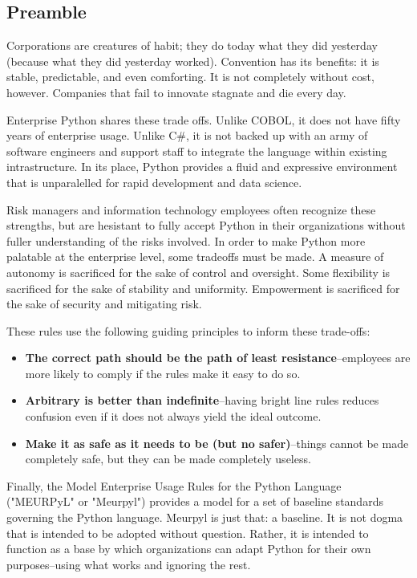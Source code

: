 

\subsection{Preamble}

Corporations are creatures of habit; they do today what they did yesterday (because what they did yesterday worked). Convention has its benefits: it is stable, predictable, and even comforting. It is not completely without cost, however. Companies that fail to innovate stagnate and die every day.

Enterprise Python shares these trade offs. Unlike COBOL, it does not have fifty years of enterprise usage. Unlike C\#, it is not backed up with an army of software engineers and support staff to integrate the language within existing intrastructure. In its place, Python provides a fluid and expressive environment that is unparalelled for rapid development and data science.

Risk managers and information technology employees often recognize these strengths, but are hesistant to fully accept Python in their organizations without fuller understanding of the risks involved. In order to make Python more palatable at the enterprise level, some tradeoffs must be made. A measure of autonomy is sacrificed for the sake of control and oversight. Some flexibility is sacrificed for the sake of stability and uniformity. Empowerment is sacrificed for the sake of security and mitigating risk. 

These rules use the following guiding principles to inform these trade-offs:

\begin{itemize}
	\item \textbf{The correct path should be the path of least resistance}--employees are more likely to comply if the rules make it easy to do so.
	\item \textbf{Arbitrary is better than indefinite}--having bright line rules reduces confusion even if it does not always yield the ideal outcome.
	\item \textbf{Make it as safe as it needs to be (but no safer)}--things cannot be made completely safe, but they can be made completely useless.
\end{itemize}

Finally, the Model Enterprise Usage Rules for the Python Language ("MEURPyL" or "Meurpyl") provides a model for a set of baseline standards governing the Python language. Meurpyl is just that: a baseline. It is not dogma that is intended to be adopted without question. Rather, it is intended to function as a base by which organizations can adapt Python for their own purposes--using what works and ignoring the rest.
